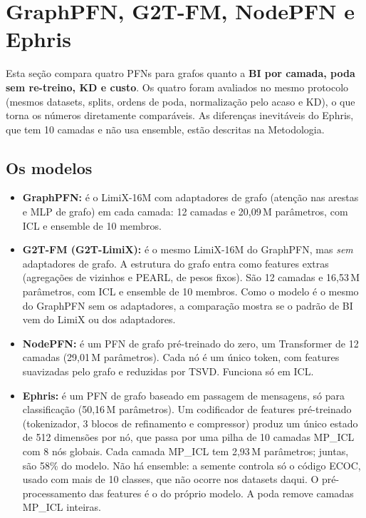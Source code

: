\documentclass[12pt,a4paper]{article}
\begin{document}

\section{GraphPFN, G2T-FM, NodePFN e Ephris}
\label{sec:pfns}

Esta seção compara quatro PFNs para grafos quanto a \textbf{BI por camada, poda sem re-treino, KD e custo}. Os quatro foram avaliados no mesmo protocolo (mesmos datasets, splits, ordens de poda, normalização pelo acaso e KD), o que torna os números diretamente comparáveis. As diferenças inevitáveis do Ephris, que tem 10 camadas e não usa ensemble, estão descritas na Metodologia.

\subsection{Os modelos}

\begin{itemize}
  \item \textbf{GraphPFN:} é o LimiX-16M com adaptadores de grafo (atenção nas arestas e MLP de grafo) em cada camada: 12 camadas e 20,09\,M parâmetros, com ICL e ensemble de 10 membros.
  \item \textbf{G2T-FM (G2T-LimiX):} é o mesmo LimiX-16M do GraphPFN, mas \emph{sem} adaptadores de grafo. A estrutura do grafo entra como features extras (agregações de vizinhos e PEARL, de pesos fixos). São 12 camadas e 16,53\,M parâmetros, com ICL e ensemble de 10 membros. Como o modelo é o mesmo do GraphPFN sem os adaptadores, a comparação mostra se o padrão de BI vem do LimiX ou dos adaptadores.
  \item \textbf{NodePFN:} é um PFN de grafo pré-treinado do zero, um Transformer de 12 camadas (29,01\,M parâmetros). Cada nó é um único token, com features suavizadas pelo grafo e reduzidas por TSVD. Funciona só em ICL.
  \item \textbf{Ephris:} é um PFN de grafo baseado em passagem de mensagens, só para classificação (50,16\,M parâmetros). Um codificador de features pré-treinado (tokenizador, 3 blocos de refinamento e compressor) produz um único estado de 512 dimensões por nó, que passa por uma pilha de 10 camadas MP\_ICL com 8 nós globais. Cada camada MP\_ICL tem 2,93\,M parâmetros; juntas, são 58\% do modelo. Não há ensemble: a semente controla só o código ECOC, usado com mais de 10 classes, que não ocorre nos datasets daqui. O pré-processamento das features é o do próprio modelo. A poda remove camadas MP\_ICL inteiras.
\end{itemize}
\end{document}
